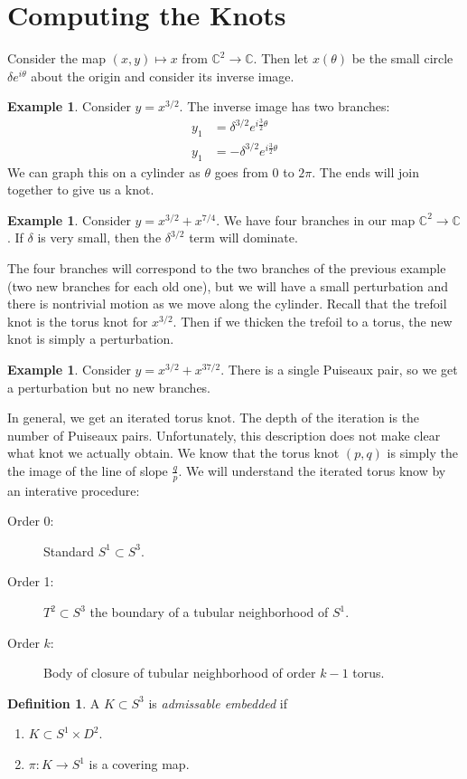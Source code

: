 \documentclass[leqno, openany]{memoir}
\theoremstyle{definition}
\newtheorem{defn}[thm]{Definition}
\newtheorem{exm}[thm]{Example}
\theoremstyle{remark}
\theoremstyle{plain}
\theoremstyle{definition}
\theoremstyle{remark}
\newcommand{\C}{\mathbb{C}}
\begin{document}
\section{Computing the Knots}%
\label{sec:computing_the_knots}


Consider the map $(x,y) \mapsto x$ from $\C^2 \to \C$. Then let $x(\theta)$ be the small circle $\delta e^{i\theta}$ about the origin and consider its inverse image.

\begin{exm}
    Consider $y = x^{3/2}$. The inverse image has two branches:
    \begin{align*}
        y_1 &= \delta^{3/2}e^{i\frac{3}{2} \theta} \\
        y_1 &= - \delta^{3/2}e^{i\frac{3}{2} \theta}
    \end{align*}
    We can graph this on a cylinder as $\theta$ goes from $0$ to $2\pi$. The ends will join together to give us a knot.
\end{exm}

\begin{exm}
    Consider $y = x^{3/2} + x^{7/4}$. We have four branches in our map $\C^2 \to \C$. If $\delta$ is very small, then the $\delta^{3/2}$ term will dominate.

    The four branches will correspond to the two branches of the previous example (two new branches for each old one), but we will have a small perturbation and there is nontrivial motion as we move along the cylinder. Recall that the trefoil knot is the torus knot for $x^{3/2}$. Then if we thicken the trefoil to a torus, the new knot is simply a perturbation.
\end{exm}

\begin{exm}
    Consider $y = x^{3/2} + x^{37/2}$. There is a single Puiseaux pair, so we get a perturbation but no new branches.
\end{exm}

In general, we get an iterated torus knot. The depth of the iteration is the number of Puiseaux pairs. Unfortunately, this description does not make clear what knot we actually obtain. We know that the torus knot $(p,q)$ is simply the the image of the line of slope $\frac{q}{p}$. We will understand the iterated torus know by an interative procedure:
\begin{description}
    \item[Order 0:]Standard $S^1 \subset S^3$.
    \item[Order 1:]$T^2 \subset S^3$ the boundary of a tubular neighborhood of $S^1$.
    \item[Order $k$:]Body of closure of tubular neighborhood of order $k-1$ torus.
\end{description}
\begin{defn}
    A $K \subset S^3$ is \textit{admissable embedded} if 
    \begin{enumerate}
        \item $K \subset S^1 \times D^2$.
        \item $\pi: K \to S^1$ is a covering map.
    \end{enumerate}
\end{defn}
\end{document}
